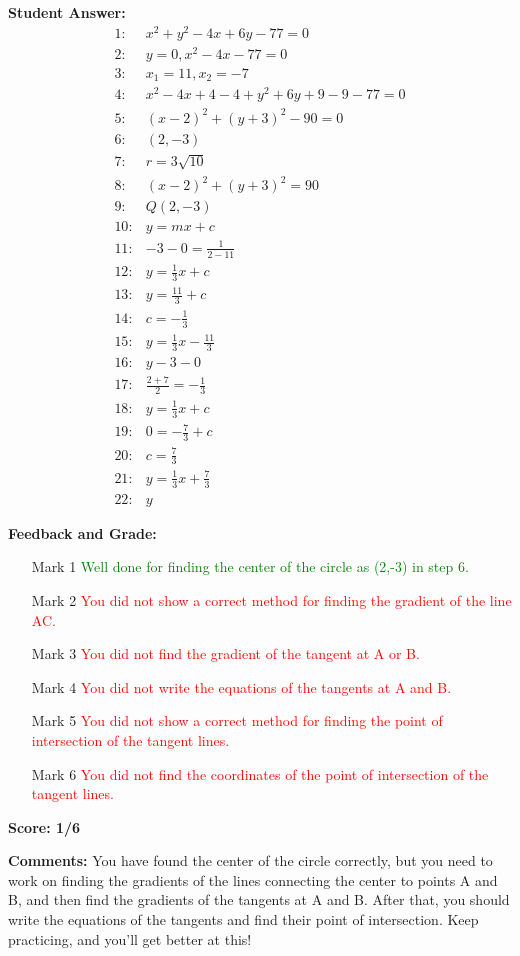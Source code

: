 \documentclass{article}
\begin{document}
\textbf{Student Answer:}
\begin{align*}
1: & x^2+y^2-4x+6y-77=0 \\
2: & y=0,x^2-4x-77=0 \\
3: & x_1=11, x_2=-7 \\
4: & x^2-4x+4-4+y^2+6y+9-9-77=0 \\
5: & (x-2)^2+(y+3)^2-90=0 \\
6: & (2,-3) \\
7: & r=3\sqrt{10} \\
8: & (x-2)^2+(y+3)^2=90 \\
9: & Q(2,-3) \\
10: & y=mx+c \\
11: & -3-0=\frac{1}{2-11} \\
12: & y=\frac{1}{3}x+c \\
13: & y=\frac{11}{3}+c \\
14: & c=-\frac{1}{3} \\
15: & y=\frac{1}{3}x-\frac{11}{3} \\
16: & y-3-0 \\
17: & \frac{2+7}{2}=-\frac{1}{3} \\
18: & y=\frac{1}{3}x+c \\
19: & 0=-\frac{7}{3}+c \\
20: & c=\frac{7}{3} \\
21: & y=\frac{1}{3}x+\frac{7}{3} \\
22: & y
\end{align*}

\textbf{Feedback and Grade:}
\begin{itemize}
\item[Mark 1] \textcolor{green}{Well done for finding the center of the circle as (2,-3) in step 6.}
\item[Mark 2] \textcolor{red}{You did not show a correct method for finding the gradient of the line AC.}
\item[Mark 3] \textcolor{red}{You did not find the gradient of the tangent at A or B.}
\item[Mark 4] \textcolor{red}{You did not write the equations of the tangents at A and B.}
\item[Mark 5] \textcolor{red}{You did not show a correct method for finding the point of intersection of the tangent lines.}
\item[Mark 6] \textcolor{red}{You did not find the coordinates of the point of intersection of the tangent lines.}
\end{itemize}

\textbf{Score: 1/6}

\textbf{Comments:} You have found the center of the circle correctly, but you need to work on finding the gradients of the lines connecting the center to points A and B, and then find the gradients of the tangents at A and B. After that, you should write the equations of the tangents and find their point of intersection. Keep practicing, and you'll get better at this!
\end{document}
